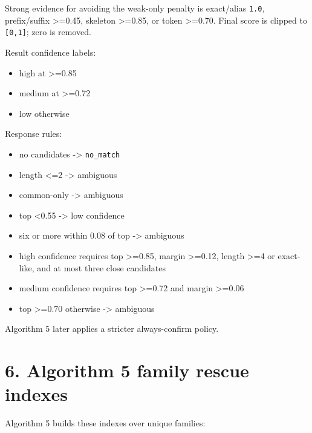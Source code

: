 Strong evidence for avoiding the weak-only penalty is exact/alias \texttt{1.0}, prefix/suffix \textgreater=0.45, skeleton \textgreater=0.85, or token \textgreater=0.70. Final score is clipped to \texttt{{[}0,1{]}}; zero is removed.

Result confidence labels:

\begin{itemize}
\tightlist
\item
  high at \textgreater=0.85
\item
  medium at \textgreater=0.72
\item
  low otherwise
\end{itemize}

Response rules:

\begin{itemize}
\tightlist
\item
  no candidates -\textgreater{} \texttt{no\_\allowbreak{}match}
\item
  length \textless=2 -\textgreater{} ambiguous
\item
  common-only -\textgreater{} ambiguous
\item
  top \textless0.55 -\textgreater{} low confidence
\item
  six or more within 0.08 of top -\textgreater{} ambiguous
\item
  high confidence requires top \textgreater=0.85, margin \textgreater=0.12, length \textgreater=4 or exact-like, and at most three close candidates
\item
  medium confidence requires top \textgreater=0.72 and margin \textgreater=0.06
\item
  top \textgreater=0.70 otherwise -\textgreater{} ambiguous
\end{itemize}

Algorithm 5 later applies a stricter always-confirm policy.

\section{6. Algorithm 5 family rescue indexes}\label{6-algorithm-5-family-rescue-indexes}

Algorithm 5 builds these indexes over unique families:

